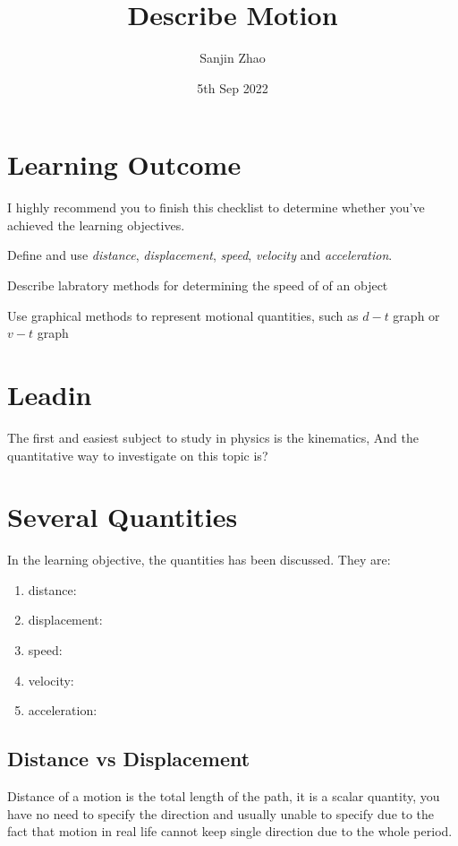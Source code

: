 \documentclass[a4paper]{tufte-handout}
\title{Describe Motion}
\author{Sanjin Zhao}
\date{5th Sep 2022}  %
\begin{document}
\maketitle%
\section*{Learning Outcome}
I highly recommend you to finish this checklist to determine whether you've achieved the learning objectives.
\begin{todolist}
	\item Define and use \emph{distance}, \emph{displacement}, \emph{speed}, \emph{velocity} and \emph{acceleration}.
  \item Describe labratory methods for determining the speed of of an object
  \item Use graphical methods to represent motional quantities, such as $d-t$ graph or $v-t$ graph
\end{todolist}
\clearpage

\section*{Leadin}
The first and easiest subject to study in physics is the kinematics, And the quantitative way to investigate on this topic is?

\section{Several Quantities}
In the learning objective, the quantities has been discussed. They are:
\begin{enumerate}
  \item distance:\uline{\hfill}
  \item displacement:\uline{\hfill}
  \item speed:\uline{\hfill}
  \item velocity:\uline{\hfill}
  \item acceleration:\uline{\hfill}
\end{enumerate}
\subsection{Distance vs Displacement}
Distance of a motion is the total length of the path, it is a scalar quantity, you have no need to specify the direction and usually unable to specify due to the fact that motion in real life cannot keep single direction due to the whole period.
\end{document}
